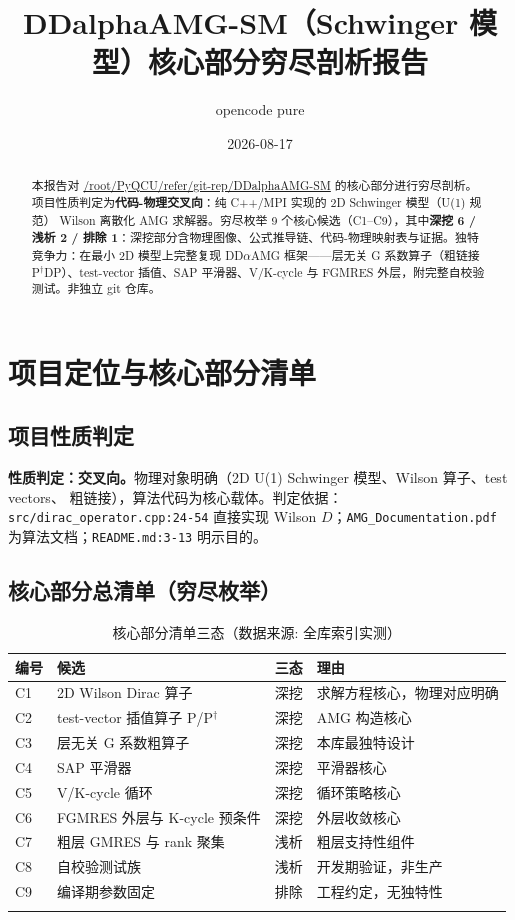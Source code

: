 \documentclass[UTF8]{ctexart}
\title{DDalphaAMG-SM（Schwinger 模型）核心部分穷尽剖析报告}
\author{opencode pure}
\date{2026-08-17}
\begin{document}
\maketitle

\begin{abstract}
本报告对 \url{/root/PyQCU/refer/git-rep/DDalphaAMG-SM} 的核心部分进行穷尽剖析。
项目性质判定为\textbf{代码-物理交叉向}：纯 C++/MPI 实现的 2D Schwinger 模型（U(1) 规范）
Wilson 离散化 AMG 求解器。穷尽枚举 9 个核心候选（C1--C9），其中\textbf{深挖 6 / 浅析 2 /
排除 1}：深挖部分含物理图像、公式推导链、代码-物理映射表与证据。独特竞争力：在最小 2D
模型上完整复现 DD$\alpha$AMG 框架——层无关 G 系数算子（粗链接 P$^\dagger$DP）、test-vector
插值、SAP 平滑器、V/K-cycle 与 FGMRES 外层，附完整自校验测试。非独立 git 仓库。
\end{abstract}

\tableofcontents

\section{项目定位与核心部分清单}

\subsection{项目性质判定}
\begin{keybox}
\textbf{性质判定：交叉向。}物理对象明确（2D U(1) Schwinger 模型、Wilson 算子、test vectors、
粗链接），算法代码为核心载体。判定依据：\texttt{src/dirac\_operator.cpp:24-54} 直接实现
Wilson $D$；\texttt{AMG\_Documentation.pdf} 为算法文档；\texttt{README.md:3-13} 明示目的。
\end{keybox}

\subsection{核心部分总清单（穷尽枚举）}
\begin{xltabular}{\textwidth}{lXXX}
\toprule
\textcolor{map}{编号} & 候选 & 三态 & 理由 \\
\midrule
\endhead
C1 & 2D Wilson Dirac 算子 & 深挖 & 求解方程核心，物理对应明确 \\
C2 & test-vector 插值算子 P/P$^\dagger$ & 深挖 & AMG 构造核心 \\
C3 & 层无关 G 系数粗算子 & 深挖 & 本库最独特设计 \\
C4 & SAP 平滑器 & 深挖 & 平滑器核心 \\
C5 & V/K-cycle 循环 & 深挖 & 循环策略核心 \\
C6 & FGMRES 外层与 K-cycle 预条件 & 深挖 & 外层收敛核心 \\
C7 & 粗层 GMRES 与 rank 聚集 & 浅析 & 粗层支持性组件 \\
C8 & 自校验测试族 & 浅析 & 开发期验证，非生产 \\
C9 & 编译期参数固定 & 排除 & 工程约定，无独特性 \\
\bottomrule
\caption{核心部分清单三态（数据来源: 全库索引实测）}
\end{xltabular}
\end{document}

